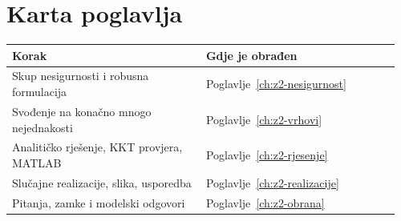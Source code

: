 \section{Karta poglavlja}
\label{sec:z2-karta}

\begin{longtable}{@{}p{0.48\linewidth} p{0.48\linewidth}@{}}
\toprule
\textbf{Korak} & \textbf{Gdje je obrađen} \\
\midrule
\endhead
Skup nesigurnosti i robusna formulacija & Poglavlje~\ref{ch:z2-nesigurnost} \\
Svođenje na konačno mnogo nejednakosti & Poglavlje~\ref{ch:z2-vrhovi} \\
Analitičko rješenje, KKT provjera, MATLAB & Poglavlje~\ref{ch:z2-rjesenje} \\
Slučajne realizacije, slika, usporedba & Poglavlje~\ref{ch:z2-realizacije} \\
Pitanja, zamke i modelski odgovori & Poglavlje~\ref{ch:z2-obrana} \\
\bottomrule
\end{longtable}
